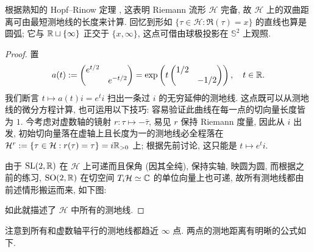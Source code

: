 根据熟知的 Hopf--Rinow 定理 \cite[第八章, 定理7.2]{ChCh}, 这表明 Riemann 流形 $\mathcal{H}$ 完备, 故 $\mathcal{H}$ 上的双曲距离可由最短测地线的长度来计算. 回忆到形如 $\{ \tau \in \mathcal{H}: \Re(\tau) = x \}$ 的直线也算是圆弧; 它与 $\mathbb{R} \sqcup \{\infty\}$ 正交于 $\{x, \infty\}$, 这点可借由球极投影在 $\mathbb{S}^2$ 上观照.
\begin{proof}
	置
	\[ a(t) := \begin{pmatrix} e^{t/2} & \\ & e^{-t/2} \end{pmatrix} = \exp \left(t \begin{pmatrix} 1/2 & \\ & -1/2 \end{pmatrix}\right), \quad t \in \mathbb{R}. \]
	我们断言 $t \mapsto a(t)i = e^t i$ 扫出一条过 $i$ 的无穷延伸的测地线. 这点既可以从测地线的微分方程计算, 也可运用以下技巧: 容易验证此曲线在每一点的切向量长度皆为 $1$. 今考虑对虚数轴的镜射 $r: \tau \mapsto -\bar{\tau}$, 易见 $r$ 保持 Riemann 度量, 因此从 $i$ 出发, 初始切向量落在虚轴上且长度为一的测地线必全程落在 $\mathcal{H}^r := \{\tau \in \mathcal{H}: r(\tau)=\tau \} = i\mathbb{R}_{>0}$ 上; 根据先前讨论, 这只能是 $t \mapsto e^t i$.

	由于 $\operatorname{SL}(2,\mathbb{R})$ 在 $\mathcal{H}$ 上可递而且保角 (因其全纯), 保持实轴, 映圆为圆, 而根据之前的练习, $\operatorname{SO}(2,\mathbb{R})$ 在切空间 $T_i \mathcal{H} \simeq \mathbb{C}$ 的单位向量上也可递, 故所有测地线都由前述情形搬运而来, 如下图:
	\begin{center}\end{center}
	如此就描述了 $\mathcal{H}$ 中所有的测地线.
\end{proof}
注意到所有和虚数轴平行的测地线都趋近 $\infty$ 点. 两点的测地距离有明晰的公式如下.

